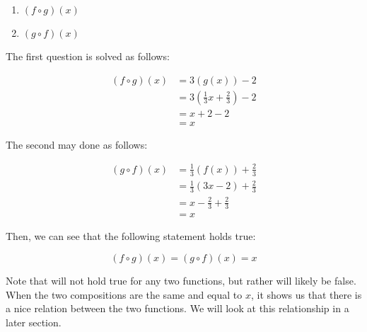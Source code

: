 \documentclass[12pt]{article}
\begin{document}
\begin{enumerate}
    \item $(f \circ g)(x)$
    \item $(g \circ f)(x)$
\end{enumerate}

The first question is solved as follows:

\begin{align}
    (f \circ g)(x) & = 3(g(x)) - 2                                  \\
                   & = 3\left(\frac{1}{3}x + \frac{2}{3}\right) - 2 \\
                   & = x + 2 - 2                                    \\
                   & = x
\end{align}

The second may done as follows:

\begin{align}
    (g \circ f)(x) & = \frac{1}{3}(f(x)) + \frac{2}{3}   \\
                   & = \frac{1}{3}(3x - 2) + \frac{2}{3} \\
                   & = x - \frac{2}{3} + \frac{2}{3}     \\
                   & = x
\end{align}

Then, we can see that the following statement holds true:

\begin{equation}
    (f \circ g)(x) = (g \circ f)(x) = x
\end{equation}

Note that will not hold true for any two functions, but rather will likely be false.
When the two compositions are the same and equal to $x$, it shows us that there is a nice relation between the two functions.
We will look at this relationship in a later section.
\end{document}
